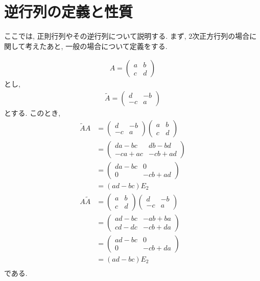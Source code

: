 \section{逆行列の定義と性質}
\label{sec:regular}
ここでは, 正則行列やその逆行列について説明する.
まず,
$2$次正方行列の場合に関して考えたあと,
一般の場合について定義をする.


\begin{align*}
  A=
  \begin{pmatrix}
    a&b\\c&d
  \end{pmatrix}
\end{align*}
とし,
\begin{align*}
  \tilde A =
  \begin{pmatrix}
    d&-b\\-c&a
  \end{pmatrix}
\end{align*}
とする.
このとき,
\begin{align*}
  \tilde A A
  &=
  \begin{pmatrix}
    d&-b\\-c&a
  \end{pmatrix}
  \begin{pmatrix}
    a&b\\c&d
  \end{pmatrix}\\
  &=
  \begin{pmatrix}
    da-bc&db-bd\\-ca+ac&-cb +ad
  \end{pmatrix}\\
  &=
  \begin{pmatrix}
    da-bc&0\\0&-cb +ad
  \end{pmatrix}\\
  &=(ad-bc)E_2\\  
A  \tilde A 
  &=
  \begin{pmatrix}
    a&b\\c&d
  \end{pmatrix}
  \begin{pmatrix}
    d&-b\\-c&a
  \end{pmatrix}\\
  &=
  \begin{pmatrix}
    ad-bc&-ab+ba\\cd-dc&-cb +da
  \end{pmatrix}\\
  &=
  \begin{pmatrix}
    ad-bc&0\\0&-cb +da
  \end{pmatrix}\\
  &=(ad-bc)E_2\\  
\end{align*}
である.

